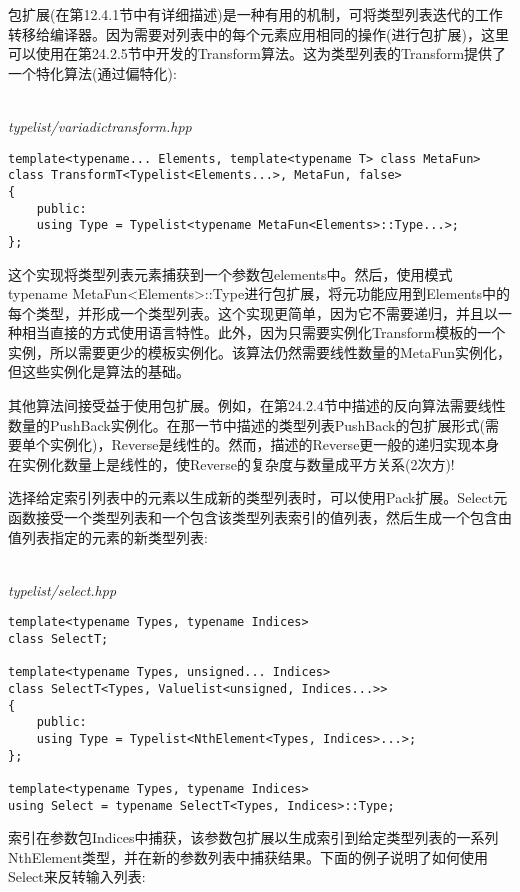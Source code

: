 包扩展(在第12.4.1节中有详细描述)是一种有用的机制，可将类型列表迭代的工作转移给编译器。因为需要对列表中的每个元素应用相同的操作(进行包扩展)，这里可以使用在第24.2.5节中开发的Transform算法。这为类型列表的Transform提供了一个特化算法(通过偏特化):

\hspace*{\fill} \\ %
\noindent
\textit{typelist/variadictransform.hpp}
\begin{lstlisting}[style=styleCXX]
template<typename... Elements, template<typename T> class MetaFun>
class TransformT<Typelist<Elements...>, MetaFun, false>
{
	public:
	using Type = Typelist<typename MetaFun<Elements>::Type...>;
};
\end{lstlisting}

这个实现将类型列表元素捕获到一个参数包elements中。然后，使用模式typename MetaFun<Elements>::Type进行包扩展，将元功能应用到Elements中的每个类型，并形成一个类型列表。这个实现更简单，因为它不需要递归，并且以一种相当直接的方式使用语言特性。此外，因为只需要实例化Transform模板的一个实例，所以需要更少的模板实例化。该算法仍然需要线性数量的MetaFun实例化，但这些实例化是算法的基础。

其他算法间接受益于使用包扩展。例如，在第24.2.4节中描述的反向算法需要线性数量的PushBack实例化。在那一节中描述的类型列表PushBack的包扩展形式(需要单个实例化)，Reverse是线性的。然而，描述的Reverse更一般的递归实现本身在实例化数量上是线性的，使Reverse的复杂度与数量成平方关系(2次方)!

选择给定索引列表中的元素以生成新的类型列表时，可以使用Pack扩展。Select元函数接受一个类型列表和一个包含该类型列表索引的值列表，然后生成一个包含由值列表指定的元素的新类型列表:

\hspace*{\fill} \\ %
\noindent
\textit{typelist/select.hpp}
\begin{lstlisting}[style=styleCXX]
template<typename Types, typename Indices>
class SelectT;

template<typename Types, unsigned... Indices>
class SelectT<Types, Valuelist<unsigned, Indices...>>
{
	public:
	using Type = Typelist<NthElement<Types, Indices>...>;
};

template<typename Types, typename Indices>
using Select = typename SelectT<Types, Indices>::Type;
\end{lstlisting}

索引在参数包Indices中捕获，该参数包扩展以生成索引到给定类型列表的一系列NthElement类型，并在新的参数列表中捕获结果。下面的例子说明了如何使用Select来反转输入列表:

